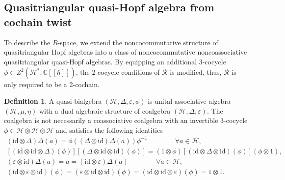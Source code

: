 \documentclass[reqno]{amsart}
\theoremstyle{definition}
\newtheorem{definition}[formula]{Definition}
\theoremstyle{remark}
\begin{document}
\subsection{Quasitriangular quasi-Hopf algebra from cochain twist} 
To describe the $R$-space, we extend the noncocommutative structure of quasitriangular Hopf algebras into a class of noncocommutative noncoassociative quasitriangular quasi-Hopf algebras. By equipping an additional 3-cocycle $\phi \in Z^2\left(\mathscr{H}^*,\mathbb{C}[[\hbar]]\right)$, the 2-cocycle conditions of $\mathcal{R}$ is modified, thus, $\mathcal{R}$ is only required to be a 2-cochain.
\begin{definition}\label{def:quasibialgebra}
    A quasi-bialgebra $(\mathscr{H},\Delta,\varepsilon, \phi)$ is unital associative algebra $(\mathscr{H},\mu,\eta)$ with a dual algebraic structure of coalgebra $(\mathscr{H},\Delta,\varepsilon)$. The coalgebra is not necessarily a coassociative coalgebra with an invertible 3-cocycle $\phi \in \mathscr{H}\otimes\mathscr{H}\otimes\mathscr{H}$ and satisfies the following identities
    \begin{equation}
        \begin{split}
            \left( {\text{id}  \otimes \Delta} \right)\Delta \left( a \right) = \phi \left( {\left( {\Delta \otimes \text{id} } \right)\Delta \left( a \right)} \right){\phi ^{ - 1}}\qquad\qquad\forall a \in \mathscr{H},\\
             \left[ {\left( {\textrm{id} \otimes \textrm{id} \otimes \Delta } \right)\left( \phi  \right)} \right]\left[ {\left( {\Delta  \otimes \textrm{id} \otimes \textrm{id}} \right)\left( \phi  \right)} \right] = \left( {1 \otimes \phi } \right)\left[ {\left( {\textrm{id} \otimes \Delta  \otimes \textrm{id}} \right)\left( \phi  \right)} \right]\left( {\phi  \otimes 1} \right),\\
              \left( {\varepsilon  \otimes \text{id}} \right)\Delta \left( a \right) = a = \left( {\text{id} \otimes \varepsilon } \right)\Delta \left( a \right) \qquad\qquad \forall a \in \mathscr{H},\\
               \left( {\text{id} \otimes \varepsilon  \otimes \text{id}} \right)\left( \phi  \right) =\left( { \varepsilon  \otimes \text{id}\otimes \text{id}} \right)\left( \phi  \right) =\left( {\text{id} \otimes\text{id}\otimes \varepsilon } \right)\left( \phi  \right) = 1\otimes 1.
        \end{split}
    \end{equation}
\end{definition}
\end{document}
